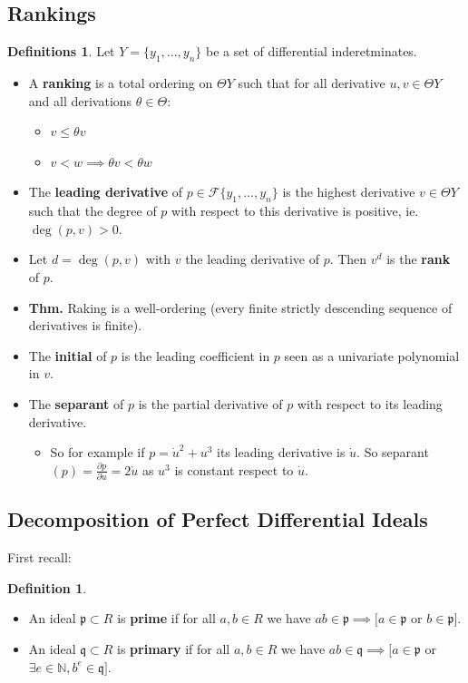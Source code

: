 \documentclass{article}
\theoremstyle{definition}
\newtheorem*{defn}{Definition}
\newtheorem*{defns}{Definitions}
\newcommand{\N}{\mathbb{N}}
\begin{document}
\subsection{Rankings}
\begin{defns}
    Let $Y=\{y_1,...,y_n\}$ be a set of differential inderetminates.
    \begin{itemize}
    \item A \textbf{ranking} is a total ordering on $\Theta Y$ such that for all derivative $u,v\in \Theta Y$ and all derivations $\theta \in \Theta$:
        \begin{itemize}[label=\textbullet]
            \item $v\leq\theta v$
            \item $v<w\implies \theta v<\theta w$
         \end{itemize} 
    \item The \textbf{leading derivative} of $p\in \mathcal F\{y_1,...,y_n\}$ is the highest derivative $v\in\Theta Y$ such that the degree of $p$ with respect to this derivative is positive, ie. $\deg (p,v)>0$.
    \item Let $d=\deg(p,v)$ with $v$ the leading derivative of $p$. Then $v^d$ is the \textbf{rank} of $p$.
    \item \textbf{Thm.} Raking is a well-ordering (every finite strictly descending sequence of derivatives is finite).
    \item The \textbf{initial} of $p$ is the leading coefficient in $p$ seen as a univariate polynomial in $v$.
    \item The \textbf{separant} of $p$ is the partial derivative of $p$ with respect to its leading derivative.
    \begin{itemize}[label=\leavevmode]
        \item So for example if $p=\dot u^2+u^3$ its leading derivative is $\dot u$. So separant$(p)=\frac{\partial p}{\partial \dot u}=2\dot u$ as $u^3$ is constant respect to $\dot u$.
    \end{itemize}
    \end{itemize}
\end{defns}
\subsection{Decomposition of Perfect Differential Ideals}
First recall:
\begin{defn}\leavevmode
    \begin{itemize}
        \item An ideal $\mathfrak p\subset R$ is \textbf{prime} if for all $a,b\in R$ we have $ab\in\mathfrak p\implies [a\in\mathfrak p$ or $b\in\mathfrak p]$.
        \item An ideal $\mathfrak q\subset R$ is \textbf{primary} if for all $a,b\in R$ we have $ab\in\mathfrak q\implies [a\in\mathfrak p$ or $\exists e\in\N, b^e\in\mathfrak q]$.
    \end{itemize}
\end{defn}
\end{document}
